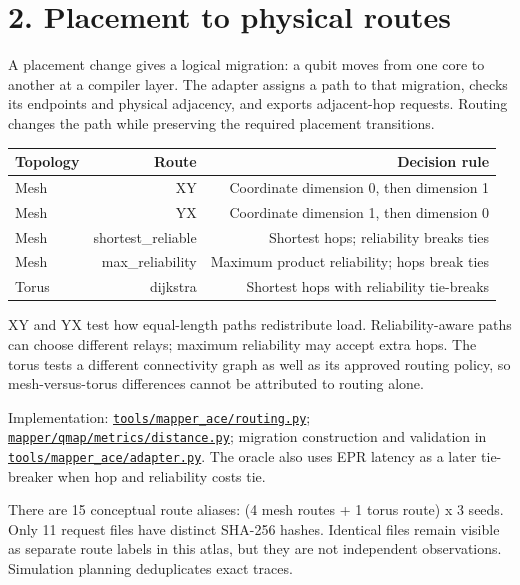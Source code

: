 \documentclass[10pt,a4paper]{article}
\begin{document}
\section*{2. Placement to physical routes}
A placement change gives a logical migration: a qubit moves from one core to another at a compiler layer. The adapter assigns a path to that migration, checks its endpoints and physical adjacency, and exports adjacent-hop requests. Routing changes the path while preserving the required placement transitions.\par
\begingroup\small\setlength{\tabcolsep}{4pt}\begin{center}\begin{tabular}{lrr}\toprule
Topology & Route & Decision rule \\
\midrule
Mesh & XY & Coordinate dimension 0, then dimension 1 \\
Mesh & YX & Coordinate dimension 1, then dimension 0 \\
Mesh & shortest\_reliable & Shortest hops; reliability breaks ties \\
Mesh & max\_reliability & Maximum product reliability; hops break ties \\
Torus & dijkstra & Shortest hops with reliability tie-breaks \\
\bottomrule\end{tabular}\end{center}\endgroup
XY and YX test how equal-length paths redistribute load. Reliability-aware paths can choose different relays; maximum reliability may accept extra hops. The torus tests a different connectivity graph as well as its approved routing policy, so mesh-versus-torus differences cannot be attributed to routing alone.\par
Implementation: \href{\detokenize{file:///home/dhruv-pansuriya/Documents/BTP/Compiler-Driven-ACE/tools/mapper_ace/routing.py}}{\nolinkurl{tools/mapper_ace/routing.py}}; \href{\detokenize{file:///home/dhruv-pansuriya/Documents/BTP/Compiler-Driven-ACE/mapper/qmap/metrics/distance.py}}{\nolinkurl{mapper/qmap/metrics/distance.py}}; migration construction and validation in \href{\detokenize{file:///home/dhruv-pansuriya/Documents/BTP/Compiler-Driven-ACE/tools/mapper_ace/adapter.py}}{\nolinkurl{tools/mapper_ace/adapter.py}}. The oracle also uses EPR latency as a later tie-breaker when hop and reliability costs tie.\par
There are 15 conceptual route aliases: (4 mesh routes + 1 torus route) x 3 seeds. Only 11 request files have distinct SHA-256 hashes. Identical files remain visible as separate route labels in this atlas, but they are not independent observations. Simulation planning deduplicates exact traces.\par
\end{document}
